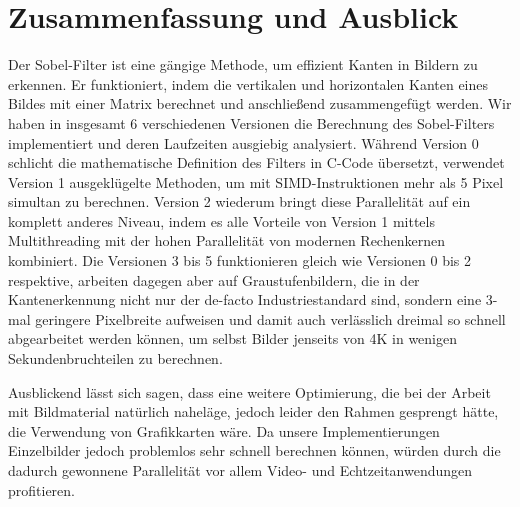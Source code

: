 \documentclass[course=erap]{aspdoc}
\begin{document}
\section{Zusammenfassung und Ausblick}
\label{sec:zusammenfassung}
Der Sobel-Filter ist eine gängige Methode, um effizient Kanten in Bildern zu erkennen.
Er funktioniert, indem die vertikalen und horizontalen Kanten eines Bildes mit einer Matrix berechnet und anschließend zusammengefügt werden.
Wir haben in insgesamt 6 verschiedenen Versionen die Berechnung des Sobel-Filters implementiert und deren Laufzeiten ausgiebig analysiert.
Während Version 0 schlicht die mathematische Definition des Filters in C-Code übersetzt, verwendet Version 1 ausgeklügelte Methoden, um mit SIMD-Instruktionen mehr als 5 Pixel simultan zu berechnen.
Version 2 wiederum bringt diese Parallelität auf ein komplett anderes Niveau, indem es alle Vorteile von Version 1 mittels Multithreading mit der hohen Parallelität von modernen Rechenkernen kombiniert.
Die Versionen 3 bis 5 funktionieren gleich wie Versionen 0 bis 2 respektive, arbeiten dagegen aber auf Graustufenbildern, die in der Kantenerkennung nicht nur der de-facto Industriestandard sind, sondern eine 3-mal geringere Pixelbreite aufweisen und damit auch verlässlich dreimal so schnell abgearbeitet werden können, um selbst Bilder jenseits von 4K in wenigen Sekundenbruchteilen zu berechnen.

Ausblickend lässt sich sagen, dass eine weitere Optimierung, die bei der Arbeit mit Bildmaterial natürlich naheläge, jedoch leider den Rahmen gesprengt hätte, die Verwendung von Grafikkarten wäre.
Da unsere Implementierungen Einzelbilder jedoch problemlos sehr schnell berechnen können, würden durch die dadurch gewonnene Parallelität vor allem Video- und Echtzeitanwendungen profitieren.



\end{document}
